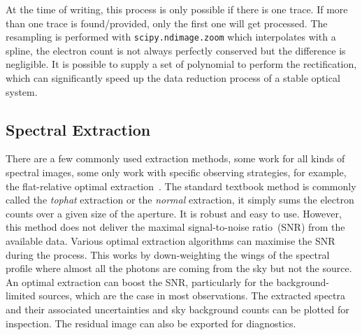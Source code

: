 \documentclass[fleqn,usenatbib]{mnras}
\begin{document}
At the time of writing, this process is only possible if there is
one trace. If more than one trace is found/provided, only the first
one will get processed. The resampling is performed with
\texttt{scipy.ndimage.zoom} which interpolates with a spline, the
electron count is not always perfectly conserved but the difference
is negligible. It is possible to supply a set of polynomial to perform
the rectification, which can significantly speed up the data reduction
process of a stable optical system.

\subsection{Spectral Extraction}
\label{sec:extract}
There are a few commonly used extraction methods, some work for
all kinds of spectral images, some only work with specific
observing strategies, for example, the flat-relative optimal
extraction~\citep{2014A&A...561A..59Z}. The standard textbook
method is commonly called the \textit{tophat} extraction or the
\textit{normal} extraction, it simply sums the electron counts over
a given size of the aperture. It is robust and easy to use. However,
this method does not deliver the maximal signal-to-noise ratio~(SNR)
from the available data. Various optimal extraction algorithms
can maximise the SNR during the process. This works by
down-weighting the wings of the spectral profile where almost
all the photons are coming from the sky but not the source. An
optimal extraction can boost the SNR, particularly for the
background-limited sources, which are the case in most
observations. The extracted spectra and their associated
uncertainties and sky background counts can be plotted for
inspection. The residual image can also be exported for
diagnostics.
\end{document}
